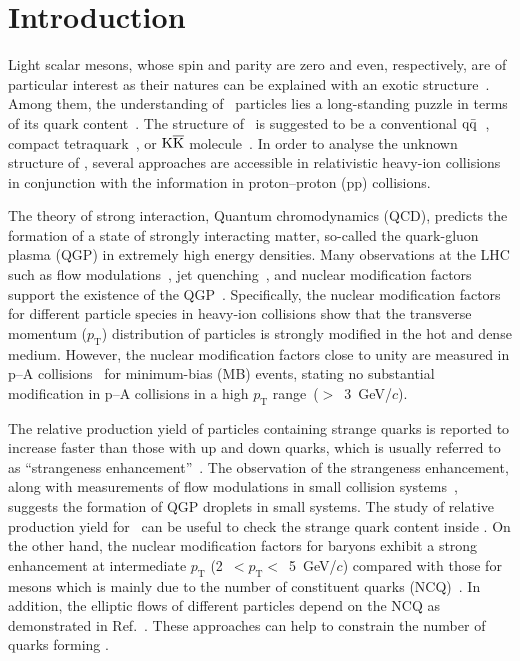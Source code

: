 
\section{Introduction}

Light scalar mesons, whose spin and parity are zero and even, respectively, are of particular interest as their natures can be explained with an exotic structure~\cite{ParticleDataGroup:2020ssz}. Among them, the understanding of \fzero\ particles lies a long-standing puzzle in terms of its quark content~\cite{ExHIC:2010gcb, Jaffe:1976ig, Maiani:2004uc}. The structure of \fzero\ is suggested to be a conventional $\rm{}q\bar{q}$~\cite{Chen:2003za}, compact tetraquark~\cite{Achasov:2020aun}, or $\rm{}K\overline{K}$ molecule~\cite{Ahmed:2020kmp}. In order to analyse the unknown structure of \fzero, several approaches are accessible in relativistic heavy-ion collisions in conjunction with the information in proton--proton (pp) collisions. 

The theory of strong interaction, Quantum chromodynamics (QCD), predicts the formation of a state of strongly interacting matter, so-called the quark-gluon plasma (QGP) in extremely high energy densities. 
Many observations at the LHC such as flow modulations~\cite{Bhalerao:2020ulk, ALICE:2019zfl}, jet quenching~\cite{ALICE:2019qyj}, and nuclear modification factors~\cite{ALICE:2019hno} support the existence of the QGP~\cite{Adams:2005dq}. 
Specifically, the nuclear modification factors for different particle species in heavy-ion collisions show that the transverse momentum ($p_{\mathrm{T}}$) distribution of particles is strongly modified in the hot and dense medium. However, the nuclear modification factors close to unity are measured in p--A collisions~\cite{ALICE:2016dei} for minimum-bias (MB) events, stating no substantial modification in p--A collisions in a high $p_{\mathrm{T}}$ range~($>$~3~GeV/$c$). 

The relative production yield of particles containing strange quarks is reported to increase faster than those with up and down quarks, which is usually referred to as ``strangeness enhancement''~\cite{ALICE:2016fzo}. The observation of the strangeness enhancement, along with measurements of flow modulations in small collision systems~\cite{PHENIX:2018lia, ALICE:2021nir}, suggests the formation of QGP droplets in small systems. The study of relative production yield for \fzero\ can be useful to check the strange quark content inside \fzero. On the other hand, the nuclear modification factors for baryons exhibit a strong enhancement at intermediate $p_{\mathrm{T}}$ (2~$<p_{\mathrm{T}}<$~5~GeV/$c$) compared with those for mesons which is mainly due to the number of constituent quarks (NCQ)~\cite{Cronin:1974zm, Fries:2003vb}. In addition, the elliptic flows of different particles depend on the NCQ as demonstrated in Ref.~\cite{Wang:2022det}. These approaches can help to constrain the number of quarks forming \fzero.

